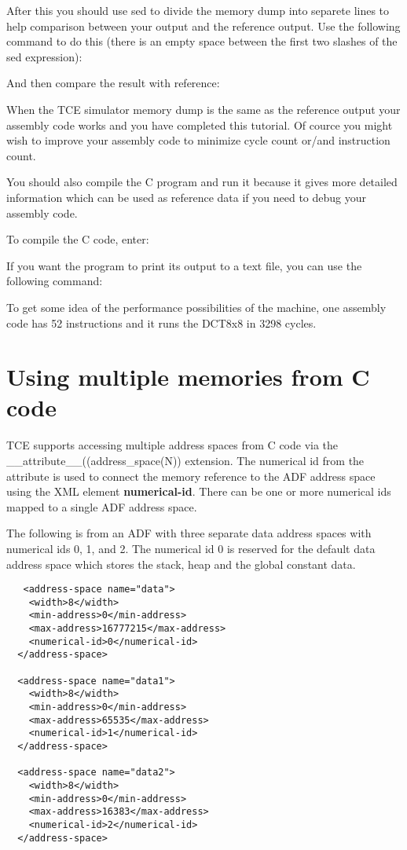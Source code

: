 \documentclass[twoside]{tceusermanual}
\begin{document}
After this you should use sed to divide the memory dump into separete lines
to help comparison between your output and the reference output. Use the
following command to do this (there is an empty space between the
first two slashes of the sed expression):


And then compare the result with reference:


When the TCE simulator memory dump is the same as the reference output your
assembly code works and you have completed this tutorial. Of
cource you might wish to improve your assembly code to minimize cycle
count or/and instruction count.

You should also compile the C program and run it because it gives more
detailed information which can be used as reference data if you need to debug
your assembly code.

To compile the C code, enter:


If you want the program to print its output to a text file, you can use the
following command:



To get some idea of the performance possibilities of the machine,
one assembly code has 52 instructions and it runs the DCT8x8 in
3298 cycles.

\section{Using multiple memories from C code}

TCE supports accessing multiple address spaces from C code via the
\_\_attribute\_\_((address\_space(N)) extension. The numerical id from
the attribute is used to connect the memory reference to the ADF 
address space using the XML element \textbf{numerical-id}. There can be
one or more numerical ids mapped to a single ADF address space.

The following is from an ADF with three separate data address spaces with
numerical ids 0, 1, and 2. The numerical id 0 is reserved for the default 
data address space which stores the stack, heap and the global constant 
data.

\begin{verbatim}
   <address-space name="data">
    <width>8</width>
    <min-address>0</min-address>
    <max-address>16777215</max-address>
    <numerical-id>0</numerical-id>
  </address-space>

  <address-space name="data1">
    <width>8</width>
    <min-address>0</min-address>
    <max-address>65535</max-address>
    <numerical-id>1</numerical-id>
  </address-space>

  <address-space name="data2">
    <width>8</width>
    <min-address>0</min-address>
    <max-address>16383</max-address>
    <numerical-id>2</numerical-id>
  </address-space>
\end{verbatim}
\end{document}
